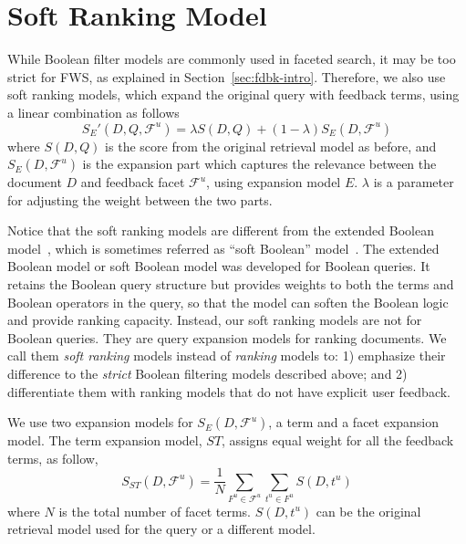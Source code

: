 \section{Soft Ranking Model} \label{sec:fdbk-ranking}
While Boolean filter models are commonly used in faceted search, it may be too strict for FWS, as explained in Section~\ref{sec:fdbk-intro}. %
Therefore, we also use soft ranking models, which expand the original query with feedback terms, using a linear combination as follows
\begin{equation}
 S_E'(D,Q,\mathcal{F}^u) = \lambda S(D,Q) + (1-\lambda) S_E(D,\mathcal{F}^u)
\end{equation}
where $S(D,Q)$ is the score from the original retrieval model as before, and $S_E(D,\mathcal{F}^u)$ is the expansion part which captures the relevance between the document $D$ and feedback facet $\mathcal{F}^u$, using expansion model $E$. $\lambda$ is a parameter for adjusting the weight between the two parts. 

Notice that the soft ranking models are different from the extended Boolean model~\cite{salton1983extended}, which is sometimes referred as ``soft Boolean'' model~\cite{kwok1993retrieval}. The extended Boolean model or soft Boolean model was developed for Boolean queries. It retains the Boolean query structure but provides weights to both the terms and Boolean operators in the query, so that the model can soften the Boolean logic and provide ranking capacity. Instead, our soft ranking models are not for Boolean queries. They are query expansion models for ranking documents. We call them \textit{soft ranking} models instead of \textit{ranking} models to: 1) emphasize their difference to the \textit{strict} Boolean filtering models described above; and 2) differentiate them with ranking models that do not have explicit user feedback.

We use two expansion models for $S_E(D,\mathcal{F}^u)$, a term and a facet expansion model. The term expansion model, $ST$, assigns equal weight for all the feedback terms, as follow,
\begin{equation}
S_{ST}(D,\mathcal{F}^u) = \frac{1}{N}\sum_{F^u\in\mathcal{F}^u}{\sum_{t^u\in F^u}{S(D,t^u)}}
\end{equation}
where $N$ is the total number of facet terms. $S(D,t^u)$ can be the original retrieval model used for the query or a different model.

